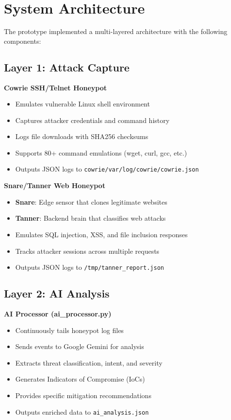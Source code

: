 \documentclass[12pt,a4paper]{report}
\begin{document}
\section{System Architecture}

The prototype implemented a multi-layered architecture with the following components:

\subsection*{Layer 1: Attack Capture}

\textbf{Cowrie SSH/Telnet Honeypot}
\begin{itemize}
\item Emulates vulnerable Linux shell environment
\item Captures attacker credentials and command history
\item Logs file downloads with SHA256 checksums
\item Supports 80+ command emulations (wget, curl, gcc, etc.)
\item Outputs JSON logs to \texttt{cowrie/var/log/cowrie/cowrie.json}
\end{itemize}

\textbf{Snare/Tanner Web Honeypot}
\begin{itemize}
\item \textbf{Snare}: Edge sensor that clones legitimate websites
\item \textbf{Tanner}: Backend brain that classifies web attacks
\item Emulates SQL injection, XSS, and file inclusion responses
\item Tracks attacker sessions across multiple requests
\item Outputs JSON logs to \texttt{/tmp/tanner\_report.json}
\end{itemize}

\subsection*{Layer 2: AI Analysis}

\textbf{AI Processor (ai\_processor.py)}
\begin{itemize}
\item Continuously tails honeypot log files
\item Sends events to Google Gemini for analysis
\item Extracts threat classification, intent, and severity
\item Generates Indicators of Compromise (IoCs)
\item Provides specific mitigation recommendations
\item Outputs enriched data to \texttt{ai\_analysis.json}
\end{itemize}
\end{document}
